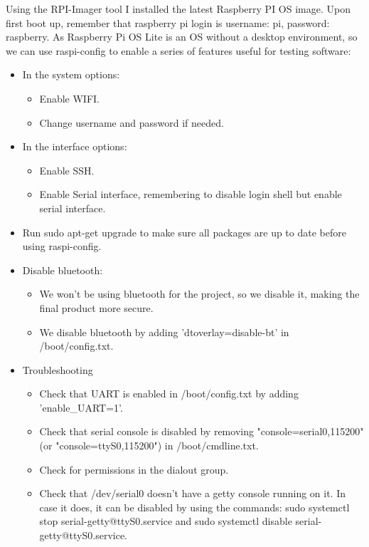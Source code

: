 \documentclass[a4paper,11pt]{scrartcl}
\begin{document}
Using the RPI-Imager tool I installed the latest Raspberry PI OS image. Upon first boot up, remember that raspberry pi login is username: pi, password: raspberry. As Raspberry Pi OS Lite is an OS without a desktop environment, so we can use raspi-config to enable a series of features useful for testing software:
\begin{itemize}    
    \item In the system options:
    \begin{itemize}
        \item Enable WIFI.
        \item Change username and password if needed.
    \end{itemize}
    \item In the interface options:
    \begin{itemize}
        \item Enable SSH.
        \item Enable Serial interface, remembering to disable login shell but enable serial interface.
    \end{itemize}
    \item Run sudo apt-get upgrade to make sure all packages are up to date before using raspi-config.
    \item Disable bluetooth:
        \begin{itemize}
            \item We won't be using bluetooth for the project, so we disable it, making the final product more secure.
            \item We disable bluetooth by adding 'dtoverlay=disable-bt' in /boot/config.txt.
        \end{itemize}
    \item Troubleshooting
        \begin{itemize}
            \item Check that UART is enabled in /boot/config.txt by adding 'enable\_UART=1'.
            \item Check that serial console is disabled by removing "console=serial0,115200" (or "console=ttyS0,115200") in /boot/cmdline.txt.
            \item Check for permissions in the dialout group.
            \item Check that /dev/serial0 doesn't have a getty console running on it. In case it does, it can be disabled by using the commands: sudo systemctl stop serial-getty@ttyS0.service and sudo systemctl disable serial-getty@ttyS0.service.
        \end{itemize}
\end{itemize}
\end{document}
